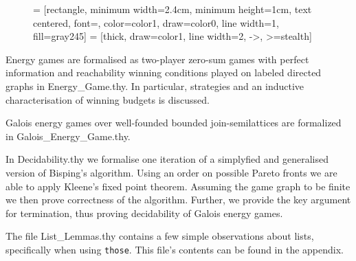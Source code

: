\begin{figure}[H]
\begin{center}


 = [rectangle, minimum width=2.4cm, minimum height=1cm, text centered, font=\normalsize, color=color1, draw=color0, line width=1, fill=gray245]
 = [thick, draw=color1, line width=2, ->, >=stealth]

\end{center}
\end{figure}

Energy games are formalised as two-player zero-sum games with perfect information and reachability winning conditions played on labeled directed graphs in Energy\_Game.thy. 
In particular, strategies and an inductive characterisation of winning budgets is discussed.

Galois energy games over well-founded bounded join-semilattices are formalized in Galois\_Energy\_Game.thy. 

In Decidability.thy we formalise one iteration of a simplyfied and generalised version of Bisping's algorithm. 
Using an order on possible Pareto fronts we are able to apply Kleene's fixed point theorem. 
Assuming the game graph to be finite we then prove correctness of the algorithm. Further, we provide the key argument for termination, thus proving decidability of Galois energy games.

The file List\_Lemmas.thy contains a few simple observations about lists, specifically when using \texttt{those}. This file's contents can be found in the appendix.

